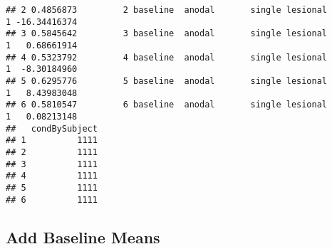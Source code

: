 \documentclass[11pt]{article}\usepackage[]{graphicx}\usepackage[]{color}
\makeatletter
\newenvironment{kframe}{%
 \def\at@end@of@kframe{}%
 \ifinner\ifhmode%
  \def\at@end@of@kframe{\end{minipage}}%
  \begin{minipage}{\columnwidth}%
 \fi\fi%
 \def\FrameCommand##1{\hskip\@totalleftmargin \hskip-\fboxsep
 \colorbox{shadecolor}{##1}\hskip-\fboxsep
     \hskip-\linewidth \hskip-\@totalleftmargin \hskip\columnwidth}%
 \MakeFramed {\advance\hsize-\width
   \@totalleftmargin\z@ \linewidth\hsize
   \@setminipage}}%
 {\par\unskip\endMakeFramed%
 \at@end@of@kframe}
\newenvironment{knitrout}{}{} %
\makeatother
\begin{document}
\begin{knitrout}
\begin{kframe}
\begin{verbatim}
## 2 0.4856873         2 baseline  anodal       single lesional         1 -16.34416374
## 3 0.5845642         3 baseline  anodal       single lesional         1   0.68661914
## 4 0.5323792         4 baseline  anodal       single lesional         1  -8.30184960
## 5 0.6295776         5 baseline  anodal       single lesional         1   8.43983048
## 6 0.5810547         6 baseline  anodal       single lesional         1   0.08213148
##   condBySubject
## 1          1111
## 2          1111
## 3          1111
## 4          1111
## 5          1111
## 6          1111
\end{verbatim}
\end{kframe}
\end{knitrout}

\subsection{Add Baseline Means}
\end{document}
